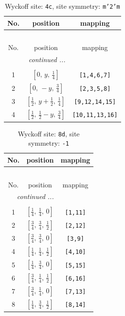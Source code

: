 \documentclass[fleqn,8pt]{jsarticle}
\begin{document}
\renewcommand{\arraystretch}{1.2}
\begin{longtable}{ccc}
\caption{Wyckoff site: {\tt 4c}, site symmetry: {\tt m'2'm}}
 \\
 \hline \hline
No. & position & mapping \\ \hline \endfirsthead

\multicolumn{2}{l}{\tablename\ \thetable{}} \\
 \hline \hline
No. & position & mapping \\ \hline \endhead

 \hline \hline
\multicolumn{2}{r}{\footnotesize\it continued ...} \\ \endfoot

 \hline \hline
\multicolumn{2}{r}{} \\ \endlastfoot

1 & $\left[ 0,\, y,\, \frac{1}{4} \right]$ & {\tt [1,4,6,7]} \\ \hline
2 & $\left[ 0,\, - y,\, \frac{3}{4} \right]$ & {\tt [2,3,5,8]} \\ \hline
3 & $\left[ \frac{1}{2},\, y + \frac{1}{2},\, \frac{1}{4} \right]$ & {\tt [9,12,14,15]} \\ \hline
4 & $\left[ \frac{1}{2},\, \frac{1}{2} - y,\, \frac{3}{4} \right]$ & {\tt [10,11,13,16]} \\
\end{longtable}
\renewcommand{\arraystretch}{1.2}
\begin{longtable}{ccc}
\caption{Wyckoff site: {\tt 8d}, site symmetry: {\tt -1}}
 \\
 \hline \hline
No. & position & mapping \\ \hline \endfirsthead

\multicolumn{2}{l}{\tablename\ \thetable{}} \\
 \hline \hline
No. & position & mapping \\ \hline \endhead

 \hline \hline
\multicolumn{2}{r}{\footnotesize\it continued ...} \\ \endfoot

 \hline \hline
\multicolumn{2}{r}{} \\ \endlastfoot

1 & $\left[ \frac{1}{4},\, \frac{1}{4},\, 0 \right]$ & {\tt [1,11]} \\ \hline
2 & $\left[ \frac{3}{4},\, \frac{3}{4},\, \frac{1}{2} \right]$ & {\tt [2,12]} \\ \hline
3 & $\left[ \frac{3}{4},\, \frac{3}{4},\, 0 \right]$ & {\tt [3,9]} \\ \hline
4 & $\left[ \frac{1}{4},\, \frac{1}{4},\, \frac{1}{2} \right]$ & {\tt [4,10]} \\ \hline
5 & $\left[ \frac{1}{4},\, \frac{3}{4},\, 0 \right]$ & {\tt [5,15]} \\ \hline
6 & $\left[ \frac{3}{4},\, \frac{1}{4},\, \frac{1}{2} \right]$ & {\tt [6,16]} \\ \hline
7 & $\left[ \frac{3}{4},\, \frac{1}{4},\, 0 \right]$ & {\tt [7,13]} \\ \hline
8 & $\left[ \frac{1}{4},\, \frac{3}{4},\, \frac{1}{2} \right]$ & {\tt [8,14]} \\
\end{longtable}
\end{document}

